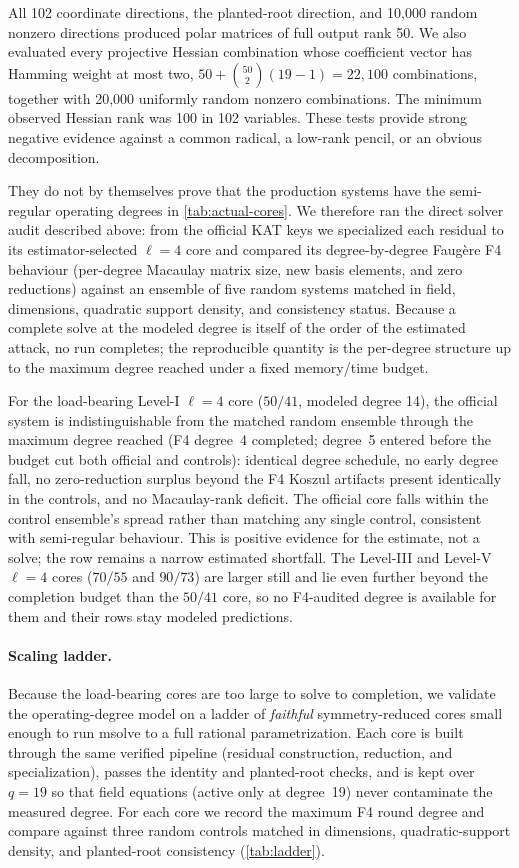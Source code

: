 \documentclass[runningheads]{llncs}
\begin{document}
All 102 coordinate directions, the planted-root direction, and 10,000 random
nonzero directions produced polar matrices of full output rank 50.  We also
evaluated every projective Hessian combination whose coefficient vector has
Hamming weight at most two, $50+\binom{50}{2}(19-1)=22{,}100$ combinations,
together with 20,000 uniformly random nonzero combinations.  The minimum
observed Hessian rank was 100 in 102 variables.  These tests provide strong
negative evidence against a common radical, a low-rank pencil, or an obvious
decomposition.

They do not by themselves prove that the production systems have the semi-regular
operating degrees in \cref{tab:actual-cores}.  We therefore ran the direct solver
audit described above: from the official KAT keys we specialized each residual to
its estimator-selected $\ell=4$ core and compared its degree-by-degree Faug\`ere
F4 behaviour (per-degree Macaulay matrix size, new basis elements, and zero
reductions) against an ensemble of five random systems matched in field,
dimensions, quadratic support density, and consistency status.  Because a
complete solve at the modeled degree is itself of the order of the estimated
attack, no run completes; the reproducible quantity is the per-degree structure
up to the maximum degree reached under a fixed memory/time budget.

For the load-bearing Level-I $\ell=4$ core ($50/41$, modeled degree 14), the
official system is indistinguishable from the matched random ensemble through the
maximum degree reached (F4 degree~4 completed; degree~5 entered before the budget
cut both official and controls): identical degree schedule, no early degree fall,
no zero-reduction surplus beyond the F4 Koszul artifacts present identically in
the controls, and no Macaulay-rank deficit.  The official core falls within the
control ensemble's spread rather than matching any single control, consistent
with semi-regular behaviour.  This is positive evidence for the estimate, not a
solve; the row remains a narrow estimated shortfall.  The Level-III and Level-V
$\ell=4$ cores ($70/55$ and $90/73$) are larger still and lie even further beyond
the completion budget than the $50/41$ core, so no F4-audited degree is available
for them and their rows stay modeled predictions.

\paragraph{Scaling ladder.}
Because the load-bearing cores are too large to solve to completion, we validate
the operating-degree model on a ladder of \emph{faithful} symmetry-reduced cores
small enough to run msolve to a full rational parametrization.  Each core is built
through the same verified pipeline (residual construction, reduction, and
specialization), passes the identity and planted-root checks, and is kept over
$q=19$ so that field equations (active only at degree~19) never contaminate the
measured degree.  For each core we record the maximum F4 round degree and compare
against three random controls matched in dimensions, quadratic-support density,
and planted-root consistency (\cref{tab:ladder}).
\end{document}
